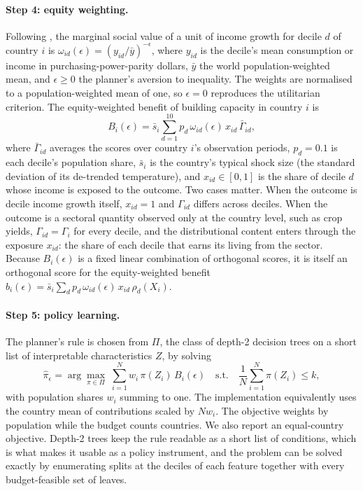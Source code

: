 \paragraph{Step 4: equity weighting.} Following \citet{atkinson1970}, the marginal social value of
a unit of income growth for decile $d$ of country $i$ is
$\omega_{id}(\epsilon)=(y_{id}/\bar y)^{-\epsilon}$, where $y_{id}$ is the decile's mean
consumption or income in purchasing-power-parity dollars, $\bar y$ the world population-weighted
mean, and $\epsilon\geq0$ the planner's aversion to inequality. The weights are normalised to a
population-weighted mean of one, so $\epsilon=0$ reproduces the utilitarian criterion. The
equity-weighted benefit of building capacity in country $i$ is
\begin{equation}\label{eq:benefit}
B_i(\epsilon) = \bar s_i \sum_{d=1}^{10} p_d\,\omega_{id}(\epsilon)\,x_{id}\,\bar\Gamma_{id},
\end{equation}
where $\bar\Gamma_{id}$ averages the scores over country $i$'s observation periods, $p_d=0.1$ is
each decile's population share, $\bar s_i$ is the country's typical shock size (the standard
deviation of its de-trended temperature), and $x_{id}\in[0,1]$ is the share of decile $d$ whose
income is exposed to the outcome. Two cases matter. When the outcome is decile income growth
itself, $x_{id}=1$ and $\Gamma_{id}$ differs across deciles. When the outcome is a sectoral quantity
observed only at the country level, such as crop yields, $\Gamma_{id}=\Gamma_i$ for every decile, and
the distributional content enters through the exposure $x_{id}$: the share of each decile that earns
its living from the sector. Because $B_i(\epsilon)$ is a fixed linear combination of orthogonal
scores, it is itself an orthogonal score for the equity-weighted benefit
$b_i(\epsilon)=\bar s_i\sum_d p_d\,\omega_{id}(\epsilon)\,x_{id}\,\rho_d(X_i)$.

\paragraph{Step 5: policy learning.} The planner's rule is chosen from $\Pi$, the class of depth-2
decision trees on a short list of interpretable characteristics $Z$, by solving
\begin{equation}\label{eq:policy}
\hat\pi_{\epsilon} = \arg\max_{\pi\in\Pi}\; \sum_{i=1}^{N} w_i\,\pi(Z_i)\,B_i(\epsilon)
\quad\text{s.t.}\quad \frac{1}{N}\sum_{i=1}^{N}\pi(Z_i)\le k ,
\end{equation}
with population shares $w_i$ summing to one. The implementation equivalently uses the
country mean of contributions scaled by $Nw_i$. The objective weights by population while the
budget counts countries. We also report an equal-country objective. Depth-2 trees keep the rule readable as a short list of
conditions, which is what makes it usable as a policy instrument, and the problem can be solved
exactly by enumerating splits at the deciles of each feature together with every budget-feasible
set of leaves.

